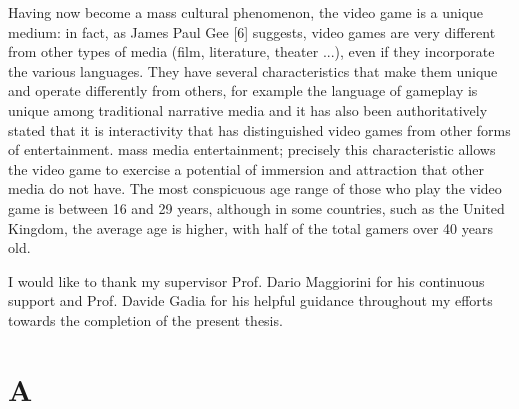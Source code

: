 \documentclass[12pt,british]{report}
\begin{document}
Having now become a mass cultural phenomenon, the video game is a unique medium: in fact, as James Paul Gee [6] suggests, video games are very different from other types of media (film, literature, theater ...), even if they incorporate the various languages. They have several characteristics that make them unique and operate differently from others, for example the language of gameplay is unique among traditional narrative media and it has also been authoritatively stated that it is interactivity that has distinguished video games from other forms of entertainment. mass media entertainment; precisely this characteristic allows the video game to exercise a potential of immersion and attraction that other media do not have.
The most conspicuous age range of those who play the video game is between 16 and 29 years, although in some countries, such as the United Kingdom, the average age is higher, with half of the total gamers over 40 years old\cite{High_Score}.

%
%

I would like to thank my supervisor Prof. Dario Maggiorini for his continuous support and Prof. Davide Gadia for his helpful guidance throughout my efforts towards the completion of the present thesis.

%
%

\afterpreface

















% 
% 

\appendix

\chapter{A}


%
%



\end{document}
